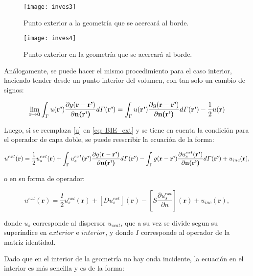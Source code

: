 \documentclass[12pt,letterpaper]{report}
\numberwithin{equation}{section}
\begin{document}
\begin{figure}[H]
	\centering
	\texttt{[image: inves3]}
	\caption{Punto exterior a la geometría que se acercará al borde. \cite{paperBEMpp} }
	\label{inci1}
\end{figure}

\begin{figure}[H]
	\centering
	\texttt{[image: inves4]}
	\caption{Punto exterior en la geometría que se acercará al borde. \cite{paperBEMpp} }
	\label{inci2}
\end{figure}

Análogamente, se puede hacer el mismo procedimiento para el caso interior, haciendo tender desde un punto interior del volumen, con tan solo un cambio de signos:

$$\lim\limits_{\textbf{r}\rightarrow \textbf{0}}\int_{\Gamma}u(\textbf{r'})\frac{\partial g(\textbf{r}-\textbf{r'})}{\partial\textbf{n(\textbf{r'})}}d\varGamma(\textbf{r'})=\int_{\Gamma}u(\textbf{r'})\frac{\partial g(\textbf{r}-\textbf{r'})}{\partial\textbf{n(\textbf{r'})}}d\varGamma(\textbf{r'}) - \frac{1}{2}u(\textbf{r})$$

Luego, si se reemplaza \ref{u} en \ref{eq: BIE_ext} y se tiene en cuenta la condición para el operador de capa doble, se puede reescribir la ecuación de la forma:

\begin{equation}
u^{ext}(\textbf{r}) = \frac{1}{2}u_s^{ext}(\textbf{r}) + \int_{\Gamma}u_s^{ext}(\textbf{r'})\frac{\partial g(\textbf{r}-\textbf{r'})}{\partial\textbf{n(\textbf{r'})}}d\varGamma(\textbf{r'}) - \int_{\Gamma}g(\textbf{r}-\textbf{r'})\frac{\partial u_s^{ext}(\textbf{r'})}{\partial\textbf{n(\textbf{r'})}}d\varGamma(\textbf{r'}) +  u_{inc}(\textbf{r}),
\label{eq: BIE_borde}	
\end{equation}

\noindent o en su forma de operador:

\begin{equation}
	u^{ext}(\textbf{r})=\frac{I}{2}u_s^{ext}(\textbf{r}) + \left[D u_s^{ext}\right](\textbf{r}) - \left[S \frac{\partial u_s^{ext}}{\partial n}\right](\textbf{r}) + u_{inc}(\textbf{r}),
\label{eq: sol us + uinc (ext)}
\end{equation}

\noindent donde $u_{s}$ corresponde al dispersor $u_{scat}$, que a su vez se divide segun su superíndice en $exterior$ e $interior$, y donde $I$ corresponde al operador de la matriz identidad.

Dado que en el interior de la geometría no hay onda incidente, la ecuación en el interior es más sencilla y es de la forma:
\end{document}
